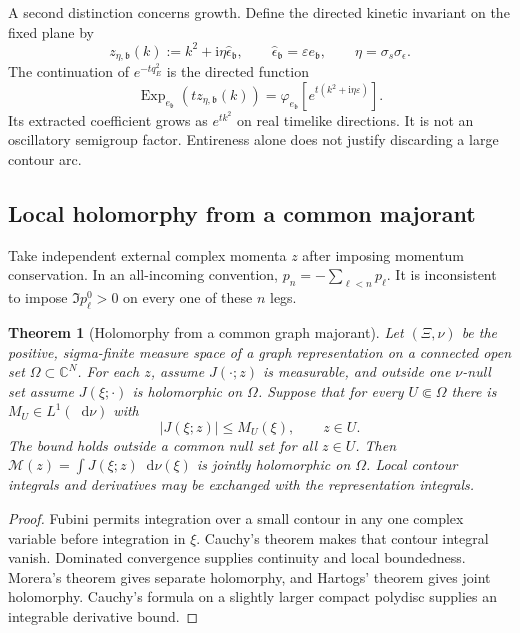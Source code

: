 \documentclass[final,5p,times,twocolumn,numbers,nopreprintline]{elsarticle}
\numberwithin{equation}{section}
\newtheorem{theorem}{Theorem}[section]
\theoremstyle{definition}
\theoremstyle{remark}
\newcommand{\dd}{\mathop{}\!\mathrm d}
\newcommand{\ii}{\mathrm i}
\newcommand{\bb}{\mathfrak b}
\newcommand{\CC}{\mathbb C}
\newcommand{\ee}{e_{\bb}}
\newcommand{\epsvec}{\hat\epsilon_{\bb}}
\newcommand{\embed}{\varphi_{\ee}}
\newcommand{\ExpDir}{\operatorname{Exp}_{\ee}}
\begin{document}
A second distinction concerns growth. Define the directed kinetic
invariant on the fixed plane by
\begin{equation}
 z_{\eta,\bb}(k):=k^2+\ii\eta\epsvec,
 \qquad \epsvec=\varepsilon\ee,
 \qquad \eta=\sigma_s\sigma_\epsilon.
 \label{eq:directed-kinetic-invariant}
\end{equation}
The continuation of \(e^{-tq_E^2}\) is the directed function
\begin{equation}
 \ExpDir\!\left(tz_{\eta,\bb}(k)\right)
 =\embed\!\left[e^{t(k^2+\ii\eta\varepsilon)}\right].
 \label{eq:heat-continuation}
\end{equation}
Its extracted coefficient grows as \(e^{tk^2}\) on real
timelike directions. It is not an oscillatory semigroup factor.
Entireness alone does not justify discarding a large contour arc.

\subsection{Local holomorphy from a common majorant}

Take independent external complex momenta \(z\) after imposing
momentum conservation. In an all-incoming convention,
\(p_n=-\sum_{\ell<n}p_\ell\). It is inconsistent to impose
\(\Im p_\ell^0>0\) on every one of these \(n\) legs.

\begin{theorem}[Holomorphy from a common graph majorant]
\label{thm:holomorphy}
Let \((\Xi,\nu)\) be the positive, sigma-finite measure space of a graph
representation on a connected open set \(\Omega\subset\CC^N\).
For each \(z\), assume \(J(\cdot;z)\) is measurable, and outside
one \(\nu\)-null set assume \(J(\xi;\cdot)\) is holomorphic on
\(\Omega\). Suppose that for every \(U\Subset\Omega\) there is
\(M_U\in L^1(\dd\nu)\) with
\begin{equation}
 |J(\xi;z)|\leq M_U(\xi),\qquad z\in U.
 \label{eq:complex-majorant}
\end{equation}
The bound holds outside a common null set for all \(z\in U\).
Then \(\mathcal M(z)=\int J(\xi;z)\dd\nu(\xi)\) is jointly
holomorphic on \(\Omega\). Local contour integrals and
derivatives may be exchanged with the representation integrals.
\end{theorem}

\begin{proof}
Fubini permits integration over a small contour in any one complex
variable before integration in \(\xi\). Cauchy's theorem makes
that contour integral vanish. Dominated convergence supplies
continuity and local boundedness. Morera's theorem gives separate
holomorphy, and Hartogs' theorem gives joint holomorphy.
Cauchy's formula on a slightly larger compact polydisc supplies an
integrable derivative bound.
\end{proof}
\end{document}
